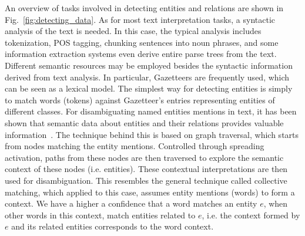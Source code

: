 An overview of tasks involved in detecting entities and relations are shown in Fig.~\ref{fig:detecting_data}. As for most text interpretation tasks, a syntactic analysis of the text is needed. In this case, the typical analysis includes tokenization, POS tagging, chunking sentences into noun phrases, and some information extraction systems even derive entire parse trees from the text. Different semantic resources may be employed besides the syntactic information derived from text analysis. In particular, Gazetteers are frequently used, which can be seen as a lexical model. The simplest way for detecting entities is simply to match words (tokens) against Gazetteer's entries representing entities of different classes. For disambiguating named entities mentions in text, it has been shown that semantic data about entities and their relations provides valuable information~\cite{DBLP:conf/esws/KlebA10}. The technique behind this is based on graph traversal, which starts from nodes matching the entity mentions. Controlled through spreading activation, paths from these nodes are then traversed to explore the semantic context of these nodes (i.e. entities). These contextual interpretations are then used for disambiguation. This resembles the general technique called collective matching, which applied to this case, assumes entity mentions (words) to form a context. We have a higher a confidence that a word matches an entity $e$, when other words in this context, match entities related to $e$, i.e. the context formed by $e$ and its related entities corresponds to the word context. 

